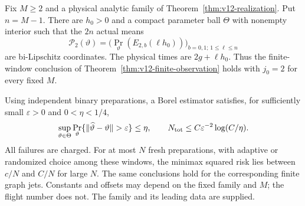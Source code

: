 \begin{theorem}
\label{thm:v13-two-flight-observation}
Fix $M\ge2$ and a physical analytic family of
Theorem~\ref{thm:v12-realization}. Put $n=M-1$. There are $h_0>0$
and a compact parameter ball $\Theta$ with nonempty interior such
that the $2n$ actual means
\begin{equation}\label{eq:v13-windows}
 \mathcal P_2(\vartheta)=
       \big(\Pr_\vartheta(E_{2,b}(\ell h_0))\big)
                    _{b=0,1;\,1\le\ell\le n}
\end{equation}
are bi-Lipschitz coordinates. The physical times are $2g+\ell h_0$.
Thus the finite-window conclusion of
Theorem~\ref{thm:v12-finite-observation} holds with $j_0=2$ for
every fixed $M$.

Using independent binary preparations, a Borel estimator satisfies,
for sufficiently small $\varepsilon>0$ and $0<\eta<1/4$,
\[
 \sup_{\vartheta\in\Theta}
  \Pr_\vartheta\{\|\widehat\vartheta-\vartheta\|>\varepsilon\}
       \le\eta,\qquad
 N_{\rm tot}\le C\varepsilon^{-2}\log(C/\eta).
\]
All failures are charged. For at most $N$ fresh preparations, with
adaptive or randomized choice among these windows, the minimax
squared risk lies between $c/N$ and $C/N$ for large $N$.
The same conclusions hold for the corresponding finite graph jets.
Constants and offsets may depend on the fixed family and $M$; the
flight number does not. The family and its leading data are supplied.
\end{theorem}
